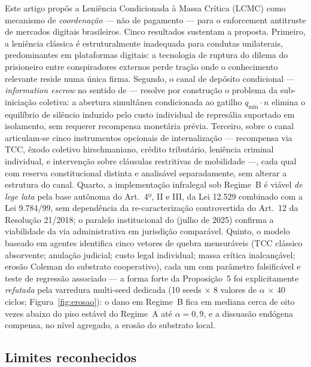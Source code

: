 \documentclass[12pt,a4paper]{article}
\begin{document}
Este artigo propôs a Leniência Condicionada à Massa Crítica (LCMC) como
mecanismo de \emph{coordenação} --- não de pagamento --- para o enforcement
antitruste de mercados digitais brasileiros. Cinco resultados sustentam a
proposta. Primeiro, a leniência clássica é estruturalmente inadequada para
condutas unilaterais, predominantes em plataformas digitais: a tecnologia de
ruptura do dilema do prisioneiro entre conspiradores externos perde tração onde
o conhecimento relevante reside numa única firma. Segundo, o canal de depósito
condicional --- \emph{information escrow} no sentido de
\citet{ayres2012information} --- resolve por construção o problema da
sub-iniciação coletiva: a abertura simultânea condicionada ao gatilho
$q_{\min}\cdot n$ elimina o equilíbrio de silêncio induzido pelo custo
individual de represália suportado em isolamento, sem requerer recompensa
monetária prévia. Terceiro, sobre o canal articulam-se cinco instrumentos
opcionais de internalização --- recompensa via TCC, êxodo coletivo
hirschmaniano, crédito tributário, leniência criminal individual, e
intervenção sobre cláusulas restritivas de mobilidade ---, cada qual com
reserva constitucional distinta e analisável separadamente, sem alterar a
estrutura do canal. Quarto, a implementação infralegal sob Regime~B é viável
\emph{de lege lata} pela base autônoma do Art.~4º, II e III, da Lei 12.529
combinado com a Lei 9.784/99, sem dependência da re-caracterização
controvertida do Art.~12 da Resolução 21/2018; o paralelo institucional do
\citet{dojatr2025} (julho de 2025) confirma a viabilidade da via administrativa
em jurisdição comparável. Quinto, o modelo baseado em agentes identifica cinco
vetores de quebra mensuráveis (TCC clássico absorvente; anulação judicial; custo legal individual; massa crítica inalcançável; erosão Coleman do
substrato cooperativo), cada um com parâmetro falsificável e teste de regressão
associado --- a forma forte da Proposição~5 foi explicitamente \emph{refutada}
pela varredura multi-seed dedicada (10 seeds $\times$ 8 valores de $\alpha$
$\times$ 40 ciclos; Figura~\ref{fig:erosao}): o dano em Regime~B fica em
mediana cerca de oito vezes abaixo do piso estável do Regime~A até $\alpha =
0{,}9$, e a dissuasão endógena compensa, no nível agregado, a erosão do
substrato local.

\subsection{Limites reconhecidos}
\end{document}
